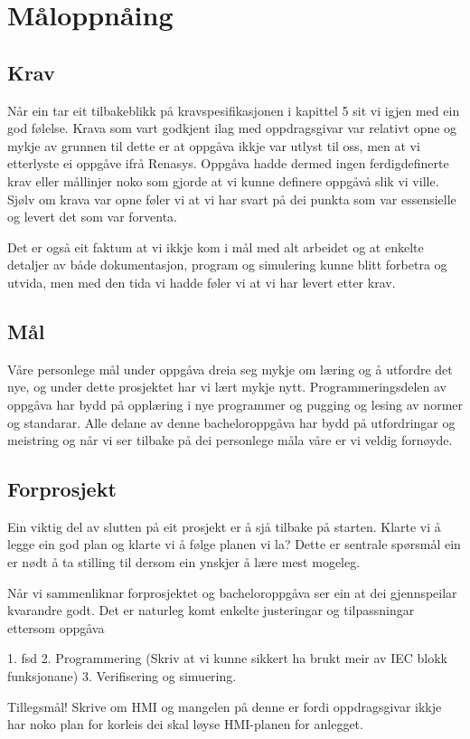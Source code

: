 \section{Måloppnåing}
\thispagestyle{fancy}

\subsection{Krav}
Når ein tar eit tilbakeblikk på kravspesifikasjonen i kapittel 5 sit vi igjen med ein god følelse.
Krava som vart godkjent ilag med oppdragsgivar var relativt opne og 
mykje av grunnen til dette er at oppgåva ikkje var utlyst til oss, men at vi etterlyste ei oppgåve ifrå Renasys.
Oppgåva hadde dermed ingen ferdigdefinerte krav eller mållinjer noko som gjorde at vi kunne definere oppgåvå slik vi ville.
Sjølv om krava var opne føler vi at vi har svart på dei punkta som var essensielle og levert det som var forventa.

Det er også eit faktum at vi ikkje kom i mål med alt arbeidet og at enkelte detaljer av både dokumentasjon, program og simulering
kunne blitt forbetra og utvida, men med den tida vi hadde føler vi at vi har levert etter krav.

\subsection{Mål}
Våre personlege mål under oppgåva dreia seg mykje om læring og å utfordre det nye, og under dette prosjektet har vi lært mykje nytt. 
Programmeringsdelen av oppgåva har bydd på opplæring i nye programmer og pugging og lesing av normer og standarar.
Alle delane av denne bacheloroppgåva har bydd på utfordringar og meistring og når vi ser tilbake på dei personlege måla våre er vi veldig fornøyde.

\subsection{Forprosjekt}
Ein viktig del av slutten på eit prosjekt er å sjå tilbake på starten.
Klarte vi å legge ein god plan og klarte vi å følge planen vi la?
Dette er sentrale spørsmål ein er nødt å ta stilling til dersom ein ynskjer å lære mest mogeleg.

Når vi sammenliknar forprosjektet og bacheloroppgåva ser ein at dei gjennspeilar kvarandre godt.
Det er naturleg komt enkelte justeringar og tilpassningar ettersom oppgåva 



1. fsd 
2. Programmering (Skriv at vi kunne sikkert ha brukt meir av IEC blokk funksjonane)
3. Verifisering og simuering.

Tillegsmål!
Skrive om HMI og mangelen på denne er fordi oppdragsgivar ikkje har noko plan for korleis
dei skal løyse HMI-planen for anlegget. 

\newpage